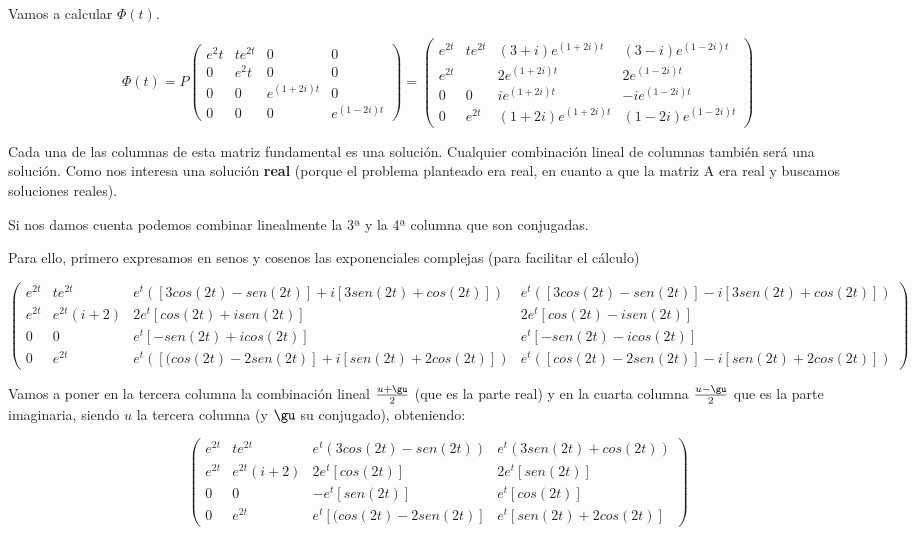\documentclass[nochap]{apuntes}
\begin{document}
Vamos a calcular $\Phi(t)$.

\[\Phi(t) = P\begin{pmatrix}
e^2t&te^{2t}&0&0\\
0&e^2t&0&0\\
0&0&e^{(1+2i)t}&0\\
0&0&0&e^{(1-2i)t}
\end{pmatrix} = \begin{pmatrix}
e^{2t} & te^{2t} & (3+i)e^{(1+2i)t} & (3-i)e^{(1-2i)t}\\
e^{2t} & & 2e^{(1+2i)t} & 2 e^{(1-2i)t}\\
0 & 0 & ie^{(1+2i)t} & -ie^{(1-2i)t}\\
0 & e^{2t} & (1+2i) e^{(1+2i)t} & (1-2i) e^{(1-2i)t}
\end{pmatrix}\]


Cada una de las columnas de esta matriz fundamental es una solución. Cualquier combinación lineal de columnas también será una solución. Como nos interesa una solución \textbf{real} (porque el problema planteado era real, en cuanto a que la matriz A era real y buscamos soluciones reales).

Si nos damos cuenta podemos combinar linealmente la 3ª y la 4ª columna que son conjugadas.

Para ello, primero expresamos en senos y cosenos las exponenciales complejas (para facilitar el cálculo)

\[\begin{pmatrix}
e^{2t} & te^{2t} & e^t\left([3cos(2t)-sen(2t)] + i [3sen(2t) + cos(2t)]\right)& e^t\left([3cos(2t)-sen(2t)] - i [3sen(2t) + cos(2t)]\right) \\
e^{2t} & e^{2t}(i+2)& 2e^t[cos(2t) + isen(2t)] & 2e^t[cos(2t) - isen(2t)]\\
0 & 0 & e^t[-sen(2t) + icos(2t)] & e^t[-sen(2t) - icos(2t)] \\
0 & e^{2t} & e^t\left([(cos(2t) - 2sen(2t)] + i[sen(2t) + 2cos(2t)]\right) & e^t\left([cos(2t) - 2sen(2t)] - i[sen(2t) + 2cos(2t)]\right)
\end{pmatrix}\]

Vamos a poner en la tercera columna la combinación lineal $\frac{u+\gu}{2}$ (que es la parte real) y en la cuarta columna $\frac{u-\gu}{2}$ que es la parte imaginaria, siendo $u$ la tercera columna (y $\gu$ su conjugado), obteniendo:

\[\begin{pmatrix}
e^{2t} & te^{2t} & e^t\left(3cos(2t)-sen(2t)\right)& e^t\left(3sen(2t) + cos(2t)\right) \\
e^{2t} & e^{2t}(i+2)& 2e^t[cos(2t)] & 2e^t[sen(2t)]\\
0 & 0 & -e^t[sen(2t)] & e^t[cos(2t)] \\
0 & e^{2t} & e^t[(cos(2t) - 2sen(2t)] & e^t[sen(2t) + 2cos(2t)]
\end{pmatrix}\]
\end{document}
